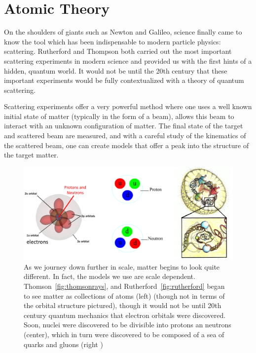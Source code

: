 \clearpage
\section{Atomic Theory}

On the shoulders of giants such as Newton and Galileo, science finally came to
know the tool which has been indispensable to modern particle physics:
scattering. Rutherford and Thompson both carried out the most important
scattering experiments in modern science and provided us with the first hints of
a hidden, quantum world. It would not be until the 20th century that these
important experiments would be fully contextualized with a theory of quantum
scattering.

Scattering experiments offer a very powerful method where one uses a well known
initial state of matter (typically in the form of a beam), allows this beam to
interact with an unknown configuration of matter. The final state of the target
and scattered beam are measured, and with a careful study of the kinematics of
the scattered beam, one can create models that offer a peak into the structure
of the target matter.  

\begin{figure}[ht]
	\centering
	\includegraphics[width=\linewidth]{./figures/scale_of_matter.png}
	\caption{
		As we journey down further in scale, matter begins to look quite different.
		In fact, the models we use are scale dependent.
		Thomson~\ref{fig:thomsonrays}, and Rutherford~\ref{fig:rutherford} began to
		see matter as collections of atoms (left)  \cite{Freudenrich2001} (though
		not in terms of the orbital structure pictured), though it would not be
		until 20th century quantum mechanics that electron orbitals were
		discovered.  Soon, nuclei were discovered to be divisible into protons an
		neutrons  \cite{Manisearth2010} (center), which in turn were discovered to
		be composed of a sea of quarks and gluons (right \cite{Morreale2009})
	}
	\label{fig:scale_of_matter}
\end{figure}

